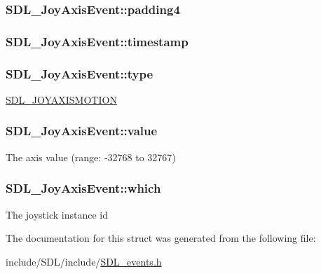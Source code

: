 \hypertarget{struct_s_d_l___joy_axis_event_a604b258940a8cd8beaa5efeb55d6f825}{
\subsubsection[{padding4}]{ S\-D\-L\-\_\-\-Joy\-Axis\-Event\-::padding4}}\label{struct_s_d_l___joy_axis_event_a604b258940a8cd8beaa5efeb55d6f825}
\hypertarget{struct_s_d_l___joy_axis_event_a60ecfc70df9eeef8e33b5dd7dc060389}{
\subsubsection[{timestamp}]{ S\-D\-L\-\_\-\-Joy\-Axis\-Event\-::timestamp}}\label{struct_s_d_l___joy_axis_event_a60ecfc70df9eeef8e33b5dd7dc060389}
\hypertarget{struct_s_d_l___joy_axis_event_aed1c873fb90ba58194e65f972933c67d}{
\subsubsection[{type}]{ S\-D\-L\-\_\-\-Joy\-Axis\-Event\-::type}}\label{struct_s_d_l___joy_axis_event_aed1c873fb90ba58194e65f972933c67d}
\hyperlink{_s_d_l__events_8h_a3b589e89be6b35c02e0dd34a55f3fccaaf0803b3f8a12de3d85f81ebd7b514cd1}{S\-D\-L\-\_\-\-J\-O\-Y\-A\-X\-I\-S\-M\-O\-T\-I\-O\-N} \hypertarget{struct_s_d_l___joy_axis_event_a53ee73e7c367934dd6edb69963be5556}{
\subsubsection[{value}]{ S\-D\-L\-\_\-\-Joy\-Axis\-Event\-::value}}\label{struct_s_d_l___joy_axis_event_a53ee73e7c367934dd6edb69963be5556}
The axis value (range\-: -\/32768 to 32767) \hypertarget{struct_s_d_l___joy_axis_event_a965719f4703a7091bcc5f07f79fcf7e1}{
\subsubsection[{which}]{ S\-D\-L\-\_\-\-Joy\-Axis\-Event\-::which}}\label{struct_s_d_l___joy_axis_event_a965719f4703a7091bcc5f07f79fcf7e1}
The joystick instance id 

The documentation for this struct was generated from the following file\-:\begin{DoxyCompactItemize}
\item 
include/\-S\-D\-L/include/\hyperlink{_s_d_l__events_8h}{S\-D\-L\-\_\-events.\-h}\end{DoxyCompactItemize}
